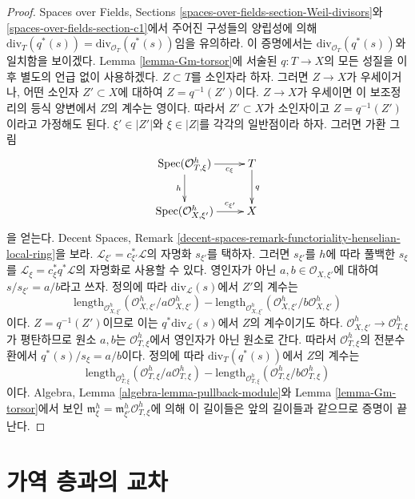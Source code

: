 \begin{proof}
Spaces over Fields, Sections
\ref{spaces-over-fields-section-Weil-divisors}와
\ref{spaces-over-fields-section-c1}에서 주어진 구성들의 양립성에 의해
$\text{div}_T(q^*(s)) = \text{div}_{\mathcal{O}_T}(q^*(s))$임을
유의하라. 이 증명에서는 $\text{div}_{\mathcal{O}_T}(q^*(s))$와
일치함을 보이겠다. Lemma \ref{lemma-Gm-torsor}에 서술된
$q : T \to X$의 모든 성질을 이후 별도의 언급 없이 사용하겠다.
$Z \subset T$를 소인자라 하자. 그러면 $Z \to X$가 우세이거나,
어떤 소인자 $Z' \subset X$에 대하여 $Z = q^{-1}(Z')$이다.
$Z \to X$가 우세이면 이 보조정리의 등식 양변에서 $Z$의 계수는
영이다. 따라서 $Z' \subset X$가 소인자이고
$Z = q^{-1}(Z')$이라고 가정해도 된다.
$\xi' \in |Z'|$와 $\xi \in |Z|$를 각각의 일반점이라 하자.
그러면 가환 그림
$$
\xymatrix{
\Spec(\mathcal{O}_{T, \xi}^h) \ar[r]_-{c_\xi} \ar[d]_h & T \ar[d]^q \\
\Spec(\mathcal{O}_{X, \xi'}^h) \ar[r]^-{c_{\xi'}} & X
}
$$
을 얻는다. Decent Spaces, Remark
\ref{decent-spaces-remark-functoriality-henselian-local-ring}을 보라.
$\mathcal{L}_{\xi'} = c_{\xi'}^*\mathcal{L}$의 자명화
$s_{\xi'}$를 택하자. 그러면 $s_{\xi'}$를 $h$에 따라 풀백한
$s_\xi$를 $\mathcal{L}_\xi = c_\xi^* q^*\mathcal{L}$의
자명화로 사용할 수 있다. 영인자가 아닌
$a, b \in \mathcal{O}_{X, \xi'}$에 대하여
$s/s_{\xi'} = a/b$라고 쓰자. 정의에 따라
$\text{div}_\mathcal{L}(s)$에서 $Z'$의 계수는
$$
\text{length}_{\mathcal{O}_{X, \xi'}^h}(
\mathcal{O}_{X, \xi'}^h/a \mathcal{O}_{X, \xi'}^h)
-
\text{length}_{\mathcal{O}_{X, \xi'}^h}(
\mathcal{O}_{X, \xi'}^h/b \mathcal{O}_{X, \xi'}^h)
$$
이다. $Z = q^{-1}(Z')$이므로 이는
$q^*\text{div}_\mathcal{L}(s)$에서 $Z$의 계수이기도 하다.
$\mathcal{O}_{X, \xi'}^h \to \mathcal{O}_{T, \xi}^h$가
평탄하므로 원소 $a, b$는 $\mathcal{O}_{T, \xi}^h$에서
영인자가 아닌 원소로 간다. 따라서 $\mathcal{O}_{T, \xi}^h$의
전분수환에서 $q^*(s)/s_\xi = a/b$이다. 정의에 따라
$\text{div}_T(q^*(s))$에서 $Z$의 계수는
$$
\text{length}_{\mathcal{O}_{T, \xi}^h}(
\mathcal{O}_{T, \xi}^h/a \mathcal{O}_{T, \xi}^h)
-
\text{length}_{\mathcal{O}_{T, \xi}^h}(
\mathcal{O}_{T, \xi}^h/b \mathcal{O}_{T, \xi}^h)
$$
이다. Algebra, Lemma \ref{algebra-lemma-pullback-module}와 Lemma
\ref{lemma-Gm-torsor}에서 보인
$\mathfrak m_\xi^h = \mathfrak m_{\xi'}^h\mathcal{O}_{T, \xi}^h$에
의해 이 길이들은 앞의 길이들과 같으므로 증명이 끝난다.
\end{proof}

\section{가역 층과의 교차}
\label{section-intersecting-with-divisors}

